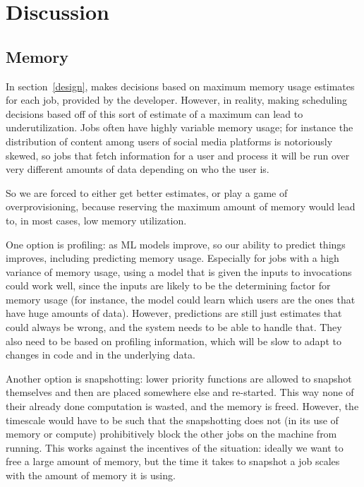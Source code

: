 \section{Discussion}

\subsection{Memory}

In section\ \ref{design}, \sys{} makes decisions based on maximum
memory usage estimates for each job, provided by the developer. However, in
reality, making scheduling decisions based off of this sort of estimate of a
maximum can lead to underutilization. Jobs often have highly variable memory
usage; for instance the distribution of content among users of social media
platforms is notoriously skewed\cite{TODO}, so jobs that fetch information for a
user and process it will be run over very different amounts of data depending on
who the user is.

So we are forced to either get better estimates, or play a game of
overprovisioning, because reserving the maximum amount of memory would lead to,
in most cases, low memory utilization.

One option is profiling: as ML models improve, so our ability to predict things
improves, including predicting memory usage. Especially for jobs with a high
variance of memory usage, using a model that is given the inputs to invocations
could work well, since the inputs are likely to be the determining factor for
memory usage (for instance, the model could learn which users are the ones that
have huge amounts of data). However, predictions are still just estimates that
could always be wrong, and the system needs to be able to handle that. They also
need to be based on profiling information, which will be slow to adapt to
changes in code and in the underlying data.

Another option is snapshotting: lower priority functions are allowed to snapshot
themselves and then are placed somewhere else and re-started. This way none of
their already done computation is wasted, and the memory is freed. However, the
timescale would have to be such that the snapshotting does not (in its use of
memory or compute) prohibitively block the other jobs on the machine from
running. This works against the incentives of the situation: ideally we want to
free a large amount of memory, but the time it takes to snapshot a job scales
with the amount of memory it is using.
 
